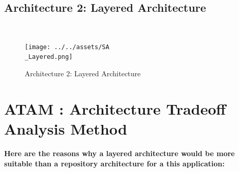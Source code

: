 \documentclass[11pt]{article}
\begin{document}
\subsection{Architecture 2: Layered Architecture}\\\pagebreak
\begin{figure}[H]
    \centering
    \texttt{[image: ../../assets/SA\\\_Layered.png]}
    \caption{Architecture 2: Layered Architecture}

\end{figure}
\section{ATAM : Architecture Tradeoff Analysis Method}
\textbf{Here are the reasons why a layered architecture would be more suitable than a repository architecture for a this application:}
\end{document}
